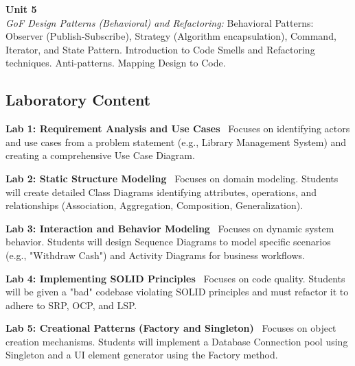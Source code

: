 \vspace{0.3cm}

\noindent\textbf{Unit 5} \\
\textit{GoF Design Patterns (Behavioral) and Refactoring:} Behavioral Patterns: Observer (Publish-Subscribe), Strategy (Algorithm encapsulation), Command, Iterator, and State Pattern. Introduction to Code Smells and Refactoring techniques. Anti-patterns. Mapping Design to Code.

\vspace{0.5cm}

\newpage

\subsection*{Laboratory Content}
\noindent\textbf{Lab 1: Requirement Analysis and Use Cases} \
Focuses on identifying actors and use cases from a problem statement (e.g., Library Management System) and creating a comprehensive Use Case Diagram. \\

\vspace{0.2cm}

\noindent\textbf{Lab 2: Static Structure Modeling} \
Focuses on domain modeling. Students will create detailed Class Diagrams identifying attributes, operations, and relationships (Association, Aggregation, Composition, Generalization). \\

\vspace{0.2cm}

\noindent\textbf{Lab 3: Interaction and Behavior Modeling} \
Focuses on dynamic system behavior. Students will design Sequence Diagrams to model specific scenarios (e.g., "Withdraw Cash") and Activity Diagrams for business workflows. \\

\vspace{0.2cm}

\noindent\textbf{Lab 4: Implementing SOLID Principles} \
Focuses on code quality. Students will be given a "bad" codebase violating SOLID principles and must refactor it to adhere to SRP, OCP, and LSP. \\

\vspace{0.2cm}

\noindent\textbf{Lab 5: Creational Patterns (Factory and Singleton)} \
Focuses on object creation mechanisms. Students will implement a Database Connection pool using Singleton and a UI element generator using the Factory method. \\

